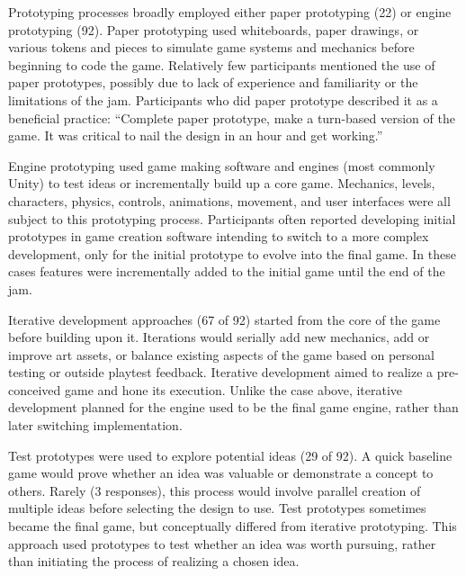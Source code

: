 \documentclass{sig-alternate}
\begin{document}
Prototyping processes broadly employed either paper prototyping (22) or engine prototyping (92).
Paper prototyping used whiteboards, paper drawings, or various tokens and pieces to simulate game systems and mechanics before beginning to code the game. Relatively few participants mentioned the use of paper prototypes, possibly due to lack of experience and familiarity or the limitations of the jam. Participants who did paper prototype described it as a beneficial practice:
``Complete paper prototype, make a turn-based version of the game. It was critical to nail the design in an hour and get working.''

Engine prototyping used game making software and engines (most commonly Unity) to test ideas or incrementally build up a core game. Mechanics, levels, characters, physics, controls, animations, movement, and user interfaces were all subject to this prototyping process. 
Participants often reported developing initial prototypes in game creation software intending to switch to a more complex development, only for the initial prototype to evolve into the final game. In these cases features were incrementally added to the initial game until the end of the jam.

Iterative development approaches (67 of 92) started from the core of the game before building upon it. Iterations would serially add new mechanics, add or improve art assets, or balance existing aspects of the game based on personal testing or outside playtest feedback.
Iterative development aimed to realize a pre-conceived game and hone its execution.
Unlike the case above, iterative development planned for the engine used to be the final game engine, rather than later switching implementation.

Test prototypes were used to explore potential ideas (29 of 92).
A quick baseline game would prove whether an idea was valuable or demonstrate a concept to others. Rarely (3 responses), this process would involve parallel creation of multiple ideas before selecting the design to use. 
Test prototypes sometimes became the final game, but conceptually differed from iterative prototyping. This approach used prototypes to test whether an idea was worth pursuing, rather than initiating the process of realizing a chosen idea.
\end{document}
